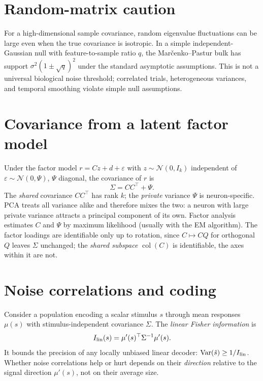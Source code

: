 \section{Random-matrix caution}
For a high-dimensional sample covariance, random eigenvalue fluctuations can be large even when the true covariance is isotropic. In a simple independent-Gaussian null with feature-to-sample ratio $q$, the Mar\v{c}enko--Pastur bulk has support $\sigma^2(1\pm\sqrt q)^2$ under the standard asymptotic assumptions. This is not a universal biological noise threshold; correlated trials, heterogeneous variances, and temporal smoothing violate simple null assumptions.

\section{Covariance from a latent factor model}
Under the factor model $r=Cz+d+\varepsilon$ with $z\sim\mathcal N(0,I_k)$ independent of $\varepsilon\sim\mathcal N(0,\Psi)$, $\Psi$ diagonal, the covariance of $r$ is
\[
\Sigma=CC^\top+\Psi.
\]
The \emph{shared} covariance $CC^\top$ has rank $k$; the \emph{private} variance $\Psi$ is neuron-specific. PCA treats all variance alike and therefore mixes the two: a neuron with large private variance attracts a principal component of its own. Factor analysis estimates $C$ and $\Psi$ by maximum likelihood (usually with the EM algorithm). The factor loadings are identifiable only up to rotation, since $C\mapsto CQ$ for orthogonal $Q$ leaves $\Sigma$ unchanged; the \emph{shared subspace} $\operatorname{col}(C)$ is identifiable, the axes within it are not.

\section{Noise correlations and coding}
Consider a population encoding a scalar stimulus $s$ through mean responses $\mu(s)$ with stimulus-independent covariance $\Sigma$. The \emph{linear Fisher information} is
\[
I_{\rm lin}(s)=\mu'(s)^\top\Sigma^{-1}\mu'(s).
\]
It bounds the precision of any locally unbiased linear decoder: $\operatorname{Var}(\hat s)\ge1/I_{\rm lin}$. Whether noise correlations help or hurt depends on their \emph{direction} relative to the signal direction $\mu'(s)$, not on their average size.


